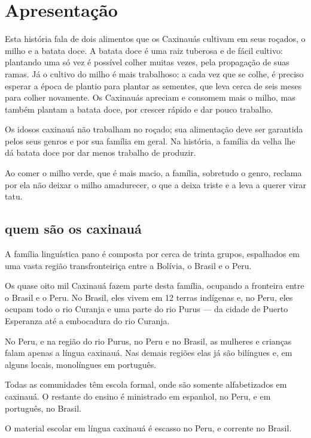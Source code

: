\chapter{Apresentação}

Esta história fala de dois alimentos que os Caxinauás cultivam em seus roçados, o milho e a batata doce. A batata doce é uma raiz tuberosa e de fácil cultivo: plantando uma só vez é possível colher muitas vezes, pela propagação de suas ramas. Já o cultivo do milho é mais trabalhoso: a cada vez que se colhe, é preciso esperar a época de plantio para plantar as sementes, que leva cerca de seis meses para colher novamente.
Os Caxinauás apreciam e consomem mais o milho, mas também plantam a batata doce, por crescer rápido e dar pouco trabalho.

Os idosos caxinauá não trabalham no roçado; sua alimentação deve ser garantida pelos seus genros e por sua família em geral. Na história, a família da velha lhe dá batata doce
por dar menos trabalho de produzir.

Ao comer o milho verde, que é mais macio, a família, sobretudo o genro, reclama por ela não deixar o milho amadurecer, o que a deixa triste e a leva a querer virar tatu.

\section{quem são os caxinauá}

A família linguística pano é composta por cerca de trinta grupos, espalhados em uma vasta região transfronteiriça entre a Bolívia, o Brasil e o Peru.

Os quase oito mil Caxinauá fazem parte desta família, ocupando a fronteira entre o Brasil
e o Peru. No Brasil, eles vivem em 12 terras indígenas e, no Peru, eles ocupam todo o rio Curanja e uma parte do rio Purus --- da cidade de Puerto Esperanza até a embocadura
do rio Curanja.

No Peru, e na região do rio Purus, no Peru e no Brasil, as mulheres e crianças falam apenas a língua caxinauá. Nas demais regiões elas já são bilíngues e, em alguns locais,
monolíngues em português.

Todas as comunidades têm escola formal, onde são somente alfabetizados em caxinauá. O
restante do ensino é ministrado em espanhol, no Peru, e em português, no Brasil. 

O material escolar em língua caxinauá é escasso no Peru, e corrente no Brasil.
